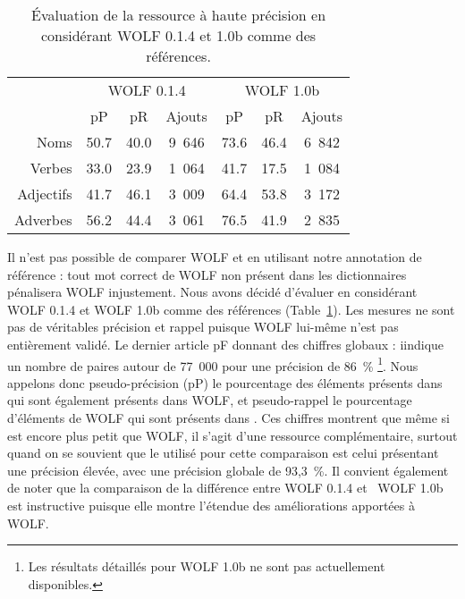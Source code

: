 \begin{table}[ht]
\centering
\begin{tabular}{rccc|ccc}
  \toprule
             & \multicolumn{3}{c}{WOLF 0.1.4}    & \multicolumn{3}{c}{WOLF 1.0b} \\
             &   pP      &    pR     & Ajouts    &     pP    &    pR    & Ajouts \\
  Noms       & 50.7     & 40.0     & 9~646     & 73.6     & 46.4    & 6~842  \\
  Verbes     & 33.0     & 23.9     & 1~064     & 41.7     & 17.5    & 1~084  \\
  Adjectifs  & 41.7     & 46.1     & 3~009     & 64.4     & 53.8    & 3~172  \\
  Adverbes   & 56.2     & 44.4     & 3~061     & 76.5     & 41.9    & 2~835  \\ 
  \bottomrule
\end{tabular}
\caption{\protect\centering\label{table:wolfcomparison}Évaluation de la ressource à haute précision en considérant WOLF 0.1.4 et 1.0b comme des références.}
\end{table}


Il n'est pas possible de comparer WOLF et \newjaws{} en utilisant notre annotation de référence : tout mot correct de WOLF non présent dans les dictionnaires pénalisera WOLF injustement. Nous avons décidé d'évaluer \newjaws{} en considérant WOLF 0.1.4 et WOLF 1.0b comme des références (Table~\ref{table:wolfcomparison}). Les mesures ne sont pas de véritables précision et rappel puisque WOLF lui-même n'est pas entièrement validé. Le dernier article pF donnant des chiffres globaux \citep{sagot2012automatic} : iindique un nombre de paires autour de 77~000 pour une précision de 86~\% \footnote{Les résultats détaillés pour WOLF 1.0b ne sont pas actuellement disponibles.}. Nous appelons donc pseudo-précision (pP) le pourcentage des éléments présents dans \newjaws{} qui sont également présents dans WOLF, et pseudo-rappel le pourcentage d'éléments de WOLF qui sont présents dans \newjaws{}. Ces chiffres montrent que même si \newjaws{} est encore plus petit que WOLF, il s'agit d'une ressource complémentaire, surtout quand on se souvient que le \newjaws{} utilisé pour cette comparaison est celui présentant une précision élevée, avec une précision globale de 93,3~\%. Il convient également de noter que la comparaison de la différence entre WOLF 0.1.4 et \ WOLF 1.0b est instructive puisque elle montre l'étendue des améliorations apportées à WOLF.


